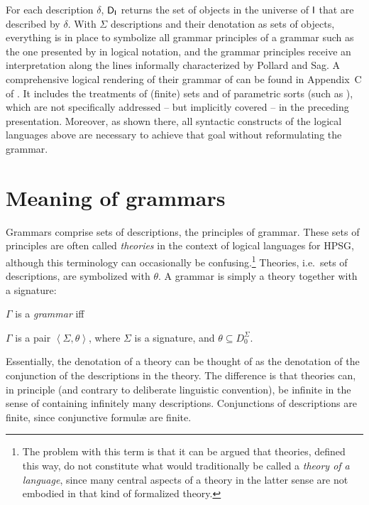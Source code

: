 \documentclass[output=paper
 	        ,biblatex
                ,babelshorthands
                ,newtxmath
                ,draftmode
                ,colorlinks, citecolor=brown
]{langscibook}
\begin{document}
{For each description $\delta$, $\mathsf{D}_{\mathsf{I}}$ returns the set of
objects in the universe of $\mathsf{I}$ that are described by
$\delta$. With $\Sigma$ descriptions and their denotation as sets of
objects, everything is in place to symbolize all grammar
principles of a grammar such as the one presented by
\citet{PollardSag1994} in logical notation, and the grammar principles
receive an interpretation along the lines
informally characterized by Pollard and Sag. A comprehensive logical
rendering of their grammar of  can be found in Appendix~C of
\citet{Richter2004a-u}. It includes the treatments of (finite) sets
and of parametric sorts (such as ), which are not
specifically addressed -- but implicitly covered -- in
the preceding presentation. Moreover, as shown there, all syntactic
constructs of the logical languages above are necessary to achieve
that goal without reformulating the grammar.



\section{Meaning of grammars}
\label{sec-grammar-meaning}

Grammars comprise sets of descriptions, the principles of grammar. These sets of
principles are often called \emph{theories} in the context of
logical languages for HPSG, although this terminology can occasionally
be confusing.\footnote{The problem with this term is that
  it can be argued that theories, defined this way, do not constitute what would
  traditionally be called a \emph{theory of a language}, since many central
  aspects of a theory in the latter sense are not embodied in that kind
  of formalized theory.} Theories, i.e.\ sets of descriptions, are
symbolized with $\theta$.  A grammar is simply a theory together with a
signature:

\begin{mydef}\label{def-grammar}
  $\Gamma$ is a \emph{grammar} iff
  
$\Gamma$ is a pair
\( \left<\Sigma, \theta \right>\), where
$\Sigma$ is a signature, and
$\theta \subseteq D_0^{\Sigma}$.
\end{mydef}

Essentially, the denotation of a theory can be thought of as
the denotation of the conjunction of the descriptions in the theory.
The difference is
that theories can, in principle (and contrary to deliberate linguistic
convention), be infinite in the sense of containing infinitely many
descriptions. Conjunctions of descriptions are finite, since conjunctive
formulæ are finite.

}
\end{document}
